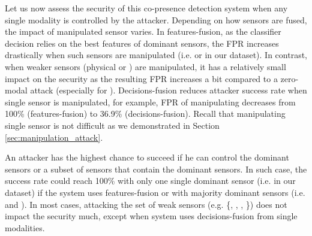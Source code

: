 Let us now assess the security of this co-presence detection system when any
single modality is controlled by the attacker. Depending on how sensors are
fused, the impact of manipulated sensor varies. In features-fusion, as the
classifier decision relies on the best features of dominant sensors, the FPR
increases drastically when such sensors are manipulated (i.e. \audio or
{\bluetooth} in our dataset). In contrast, when weaker sensors (physical or
{\wifi}) are manipulated, it has a relatively small impact on the security as
the resulting FPR increases a bit compared to a zero-modal attack (especially
for \wifi). Decisions-fusion reduces attacker success rate when single sensor
is manipulated, for example, FPR of manipulating \bluetooth decreases from
100\% (features-fusion) to 36.9\% (decisions-fusion). 
Recall that manipulating single sensor is not difficult as we demonstrated in Section
\ref{sec:manipulation_attack}.

An attacker has the highest chance to succeed if he can control the dominant
sensors or a subset of sensors that contain the dominant sensors. In such case,
the success rate could reach 100\% with only one single dominant sensor (i.e.
\bluetooth in our dataset) if the system uses features-fusion or with
majority dominant sensors (i.e. \audio and \bluetooth). In most cases,
attacking the set of weak sensors (e.g. \{\altitude, \gas, \humidity,
\temperature{}\}) does not impact the security much, except when system uses
decisions-fusion from single modalities.






